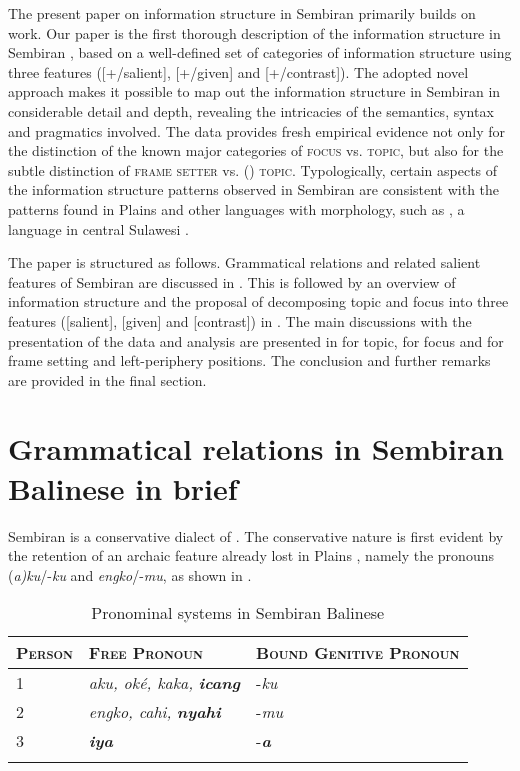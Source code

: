 \documentclass[output=paper
,modfonts
,nonflat]{langsci/langscibook}
\begin{document}
The present paper on information structure in Sembiran  primarily builds on  work. Our paper is the first thorough description of the information structure in Sembiran , based on a well-defined set of categories of information structure using three features ([+/\textminus salient], [+/\textminus given] and [+/\textminus contrast]). The adopted novel approach makes it possible to map out the information structure in Sembiran  in considerable detail and depth, revealing the intricacies of the semantics, syntax and pragmatics involved. The data provides fresh empirical evidence not only for the distinction of the known major categories of \textsc{focus} vs. \textsc{topic}, but also for the subtle distinction of \textsc{frame setter} vs. (\textsc{) topic}. Typologically, certain aspects of the information structure patterns observed in Sembiran  are consistent with the patterns found in Plains  \citep{Pastika2006} and other  languages with  morphology, such as , a language in central Sulawesi \citep{Quick2005, Quick2007}.  

The paper is structured as follows. Grammatical relations and related salient features of Sembiran  are discussed in . This is followed by an overview of information structure and the proposal of decomposing topic and focus into three features ([salient], [given] and [contrast]) in . The main discussions with the presentation of the data and analysis are presented in  for topic,  for focus and  for frame setting and left-periphery positions. The conclusion and further remarks are provided in the final section. 

\section{\label{s:arka:2}Grammatical relations in Sembiran Balinese in brief}

Sembiran  is a conservative dialect of . The conservative nature is first evident by the retention of an archaic  feature already lost in Plains , namely the pronouns (\textit{a)ku}/-\textit{ku} and \textit{engko}/-\textit{mu}, as shown in . 

\begin{table}
\begin{tabular}{lll}
	\lsptoprule
	\textsc{Person} & \textsc{Free Pronoun} & \textsc{Bound Genitive Pronoun}\\
	\midrule
	\textsc{1} & \textit{aku, oké, kaka,} \textbf{\textit{icang}} & -\textit{ku}\\
	\textsc{2} & \textit{engko, cahi,} \textbf{\textit{nyahi}} & -\textit{mu}\\
	\textsc{3} &  \textbf{\textit{iya}} & -\textbf{\textit{a}}\\
	\lspbottomrule
\end{tabular}
\caption{Pronominal systems in Sembiran Balinese}
\label{tab:arka:1}
\end{table}
\end{document}
